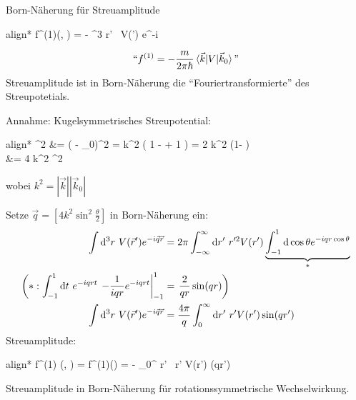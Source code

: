 	
	Born-Näherung für Streuamplitude
		\begin{empheq}[box=\boxed]{align*}
			f^{(1)}(\theta, \phi) =
			- 
			\int \diff^3 r' ~V(') e^{-i  \cdot {}}
		\end{empheq} 
		\begin{align*}
			``f^{(1)} = -\frac{m}{2 \pi \hbar} 
			\braket{ \vec{k} | V | \vec{k}_0}\text{''}
		\end{align*}
	Streuamplitude ist in Born-Näherung die ``Fouriertransformierte'' des Streupotetials.
	
	Annahme: Kugelsymmetrisches Streupotential:
		\begin{empheq}[box=\boxed]{align*}
			^2 &= (\vec{k} - _0)^2 
			= k^2 \left( 1 - \frac{2  \vec{k}_0}{k^2}
			+ 1 \right)	
			= 2 k^2 (1- \cos \theta) \\
			&= 4 k^2 \sin^2 
		\end{empheq}
	wobei $k^2 = |\vec{k}| |\vec{k}_0|$
	
	Setze $\vec{q} = \left[ 4 k^2 \sin^2 \frac{\theta}{2} 
	\right]$ in Born-Näherung ein:
		\begin{align*}
			\int \mathrm{d}^3 r ~V(\vec{r}') e^{-i \vec{q} \vec{r}}
			&= 2 \pi \int_{-\infty}^{\infty} \mathrm{d} r' 
			~r'^2 V(r') 
			\underbrace{\int_{-1}^1 \mathrm{d} \cos \theta 
			e^{-iqr \cos \theta}}_{\substack{*}} \\
			\left(
			*: \int_{-1}^1 \mathrm{d} t ~e^{-iqr t} \right.
			\left. 
				- \frac{1}{iqr} e^{-iqrt}
			\right|_{-1}^1
			&= 
				\left. \frac{2}{qr} \sin (qr)
			\right) \\
			\int \mathrm{d}^3 r ~V(\vec{r}') e^{-i \vec{q} \vec{r}}
			&= \frac{4 \pi}{q} \int_{0}^{\infty}
			\mathrm{d} r' ~r' V(r') \sin (qr')
		\end{align*}
	Streuamplitude: 
		\begin{empheq}[box=\boxed]{align*}
			f^{(1)} (\theta, \phi) = f^{(1)}(\theta)
			= -  
			\int_0^{\infty} \diff r' ~r' V(r') \sin (qr')
		\end{empheq}
	Streuamplitude in Born-Näherung für rotationssymmetrische Wechselwirkung.
	

